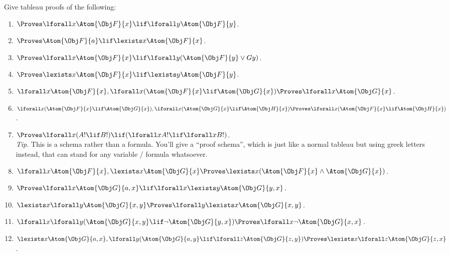 \documentclass[../../../../include/open-logic-section]{subfiles}
\begin{document}


\begin{prob}
Give tableau proofs of the following:
\begin{enumerate}
\item $\Proves\lforall x\Atom{\Obj F}{x}\lif\lforall y\Atom{\Obj F}{y}$.
\item $\Proves \Atom{\Obj F}{a}\lif\lexists x\Atom{\Obj F}{x}$.
\item $\Proves\lforall x\Atom{\Obj F}{x}\lif\lforall y(\Atom{\Obj F}{y}\lor Gy)$.
\item $\Proves\lexists x\Atom{\Obj F}{x}\lif\lexists y\Atom{\Obj F}{y}$.
\item $\lforall x\Atom{\Obj F}{x},\lforall x(\Atom{\Obj F}{x}\lif \Atom{\Obj G}{x})\Proves\lforall x\Atom{\Obj G}{x}$.
\item $\lforall x(\Atom{\Obj F}{x}\lif \Atom{\Obj G}{x}),\lforall x(\Atom{\Obj G}{x}\lif \Atom{\Obj H}{x})\Proves\lforall x(\Atom{\Obj F}{x}\lif \Atom{\Obj H}{x})$.
\item $\Proves\lforall x(A! \lif B!)\lif(\lforall x A!\lif\lforall x B!)$.\\
\emph{Tip}. This is a schema rather than a formula. You'll give a
``proof schema'', which is just like a normal tableau but using
greek letters instead, that can stand for any variable / formula whatsoever.
\item $\lforall x\Atom{\Obj F}{x},\lexists x\Atom{\Obj G}{x}\Proves\lexists x(\Atom{\Obj F}{x}\land \Atom{\Obj G}{x})$.
\item $\Proves\lforall x\Atom{\Obj G}{a,x}\lif\lforall x\lexists y\Atom{\Obj G}{y,x}$.
\item $\lexists x\lforall y\Atom{\Obj G}{x,y}\Proves\lforall y\lexists x\Atom{\Obj G}{x,y}$.
\item $\lforall x\lforall y(\Atom{\Obj G}{x,y}\lif\lnot \Atom{\Obj G}{y,x})\Proves\lforall x\lnot \Atom{\Obj G}{x,x}$.
\item $\lexists x\Atom{\Obj G}{a,x},\lforall y(\Atom{\Obj G}{a,y}\lif\lforall z\Atom{\Obj G}{z,y})\Proves\lexists x\lforall z\Atom{\Obj G}{z,x}$.
\end{enumerate}
\end{prob}
\end{document}
